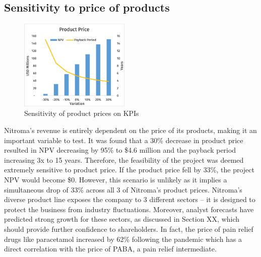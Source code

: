 \subsection{Sensitivity to price of products}
\begin{figure}
    \caption{Sensitivity of product prices on KPIs}
    \label{Sensitivity_ProductPrice}
    \includegraphics[width=0.47\textwidth]{chapters/6-economics/figures/Sensitivity_ProductPrice.jpg}
\end{figure}
Nitroma’s revenue is entirely dependent on the price of its products, making it an important variable to test. It was found that a 30\% decrease in product price resulted in NPV decreasing by 95\% to \$4.6 million and the payback period increasing 3x to 15 years. Therefore, the feasibility of the project was deemed extremely sensitive to product price.  If the product price fell by 33\%, the project NPV would become \$0. However, this scenario is unlikely as it implies a simultaneous drop of 33\% across all 3 of Nitroma’s product prices. Nitroma’s diverse product line exposes the company to 3 different sectors – it is designed to protect the business from industry fluctuations. Moreover, analyst forecasts have predicted strong growth for these sectors, as discussed in Section XX, which should provide further confidence to shareholders. In fact, the price of pain relief drugs like paracetamol increased by 62\% following the pandemic which has a direct correlation with the price of PABA, a pain relief intermediate.

